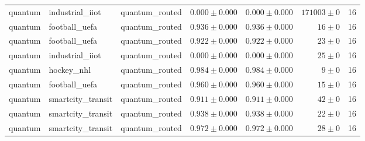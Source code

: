 \begin{table}[htbp]
\begin{tabular}{l l l r r r r}
quantum & industrial\_iiot & quantum\_routed & $0.000\pm0.000$ & $0.000\pm0.000$ & $171003\pm0$ & 16 \\
quantum & football\_uefa & quantum\_routed & $0.936\pm0.000$ & $0.936\pm0.000$ & $16\pm0$ & 16 \\
quantum & football\_uefa & quantum\_routed & $0.922\pm0.000$ & $0.922\pm0.000$ & $23\pm0$ & 16 \\
quantum & industrial\_iiot & quantum\_routed & $0.000\pm0.000$ & $0.000\pm0.000$ & $25\pm0$ & 16 \\
quantum & hockey\_nhl & quantum\_routed & $0.984\pm0.000$ & $0.984\pm0.000$ & $9\pm0$ & 16 \\
quantum & football\_uefa & quantum\_routed & $0.960\pm0.000$ & $0.960\pm0.000$ & $15\pm0$ & 16 \\
quantum & smartcity\_transit & quantum\_routed & $0.911\pm0.000$ & $0.911\pm0.000$ & $42\pm0$ & 16 \\
quantum & smartcity\_transit & quantum\_routed & $0.938\pm0.000$ & $0.938\pm0.000$ & $22\pm0$ & 16 \\
quantum & smartcity\_transit & quantum\_routed & $0.972\pm0.000$ & $0.972\pm0.000$ & $28\pm0$ & 16 \\
\hline
\end{tabular}
\end{table}
